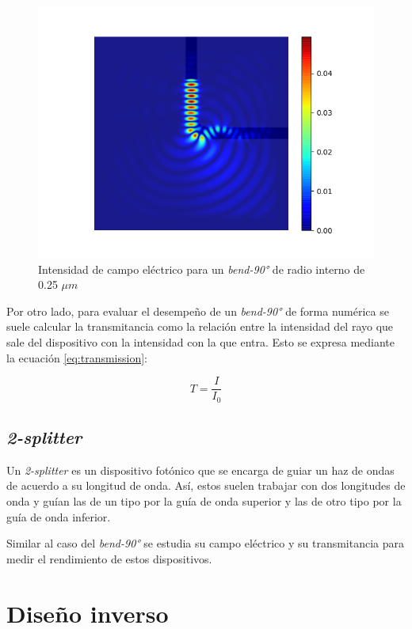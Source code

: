 \begin{figure}[h]
  \centering
  \includegraphics[scale=0.8]{image/theory/bend-field.png}
  \caption{Intensidad de campo eléctrico para un \emph{bend-90°} de radio interno de 0.25 $\mu m$}
  \label{fig:efield}
\end{figure}

Por otro lado, para evaluar el desempeño de un \emph{bend-90°} de forma numérica se suele calcular la transmitancia como la relación entre la intensidad del rayo que sale del dispositivo con la intensidad con la que entra. Esto se expresa mediante la ecuación \ref{eq:transmission}:

\begin{equation}
  T = \frac{I}{I_0}
\label{eq:transmission}
\end{equation}


\subsection{\emph{2-splitter}}

Un \emph{2-splitter} es un dispositivo fotónico que se encarga de guiar un haz de ondas de acuerdo a su longitud de onda.
Así, estos suelen trabajar con dos longitudes de onda y guían las de un tipo por la guía de onda superior y las de otro tipo por la guía de onda inferior.

Similar al caso del \emph{bend-90°} se estudia su campo eléctrico y su transmitancia para medir el rendimiento de estos dispositivos.

\section{Diseño inverso}

